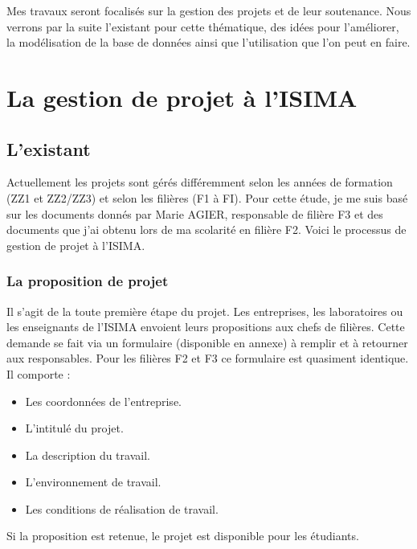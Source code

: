 \documentclass[a4paper,11pt]{report}
\begin{document}
\normalsize{
\noindent
Mes travaux seront focalisés sur la gestion des projets et de leur soutenance. Nous verrons par la suite l'existant pour cette thématique, des idées pour l'améliorer, la modélisation de la base de données ainsi que l'utilisation que l'on peut en faire.
}


\chapter {La gestion de projet à l'ISIMA }

\section{L'existant}

\normalsize{
Actuellement les projets sont gérés différemment selon les années de formation (ZZ1 et ZZ2/ZZ3) et selon les filières (F1 à FI). Pour cette étude, je me suis basé sur les documents donnés par Marie AGIER, responsable de filière F3 et des documents que j'ai obtenu lors de ma scolarité en filière F2. Voici le processus de gestion de projet à l'ISIMA. 
}

\subsection{La proposition de projet}

\normalsize{
Il s'agit de la toute première étape du projet. Les entreprises, les laboratoires ou les enseignants de l'ISIMA envoient leurs propositions aux chefs de filières. Cette demande se fait via un formulaire (disponible en annexe) à remplir et à retourner aux responsables. Pour les filières F2 et F3 ce formulaire est quasiment identique. Il comporte : \\
}

\begin{itemize}
\item Les coordonnées de l'entreprise.
\item L'intitulé du projet.
\item La description du travail.
\item L'environnement de travail.
\item Les conditions de réalisation de travail.\\
\end{itemize}

\normalsize{
\noindent
Si la proposition est retenue, le projet est disponible pour les étudiants.
}
\end{document}
